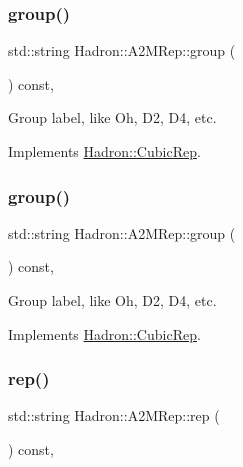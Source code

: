 \subsubsection{\texorpdfstring{group()}{group()}\hspace{0.1cm}{\footnotesize\ttfamily [2/3]}}
{\footnotesize\ttfamily std\+::string Hadron\+::\+A2\+M\+Rep\+::group (\begin{DoxyParamCaption}{ }\end{DoxyParamCaption}) const\hspace{0.3cm}{\ttfamily [inline]}, {\ttfamily [virtual]}}

Group label, like Oh, D2, D4, etc. 

Implements \mbox{\hyperlink{structHadron_1_1CubicRep_a0748f11ec87f387062c8e8981339a29c}{Hadron\+::\+Cubic\+Rep}}.

\mbox{\label{structHadron_1_1A2MRep_acc01c7c94d15b610d4366faa2bc3afaf}} 
\subsubsection{\texorpdfstring{group()}{group()}\hspace{0.1cm}{\footnotesize\ttfamily [3/3]}}
{\footnotesize\ttfamily std\+::string Hadron\+::\+A2\+M\+Rep\+::group (\begin{DoxyParamCaption}{ }\end{DoxyParamCaption}) const\hspace{0.3cm}{\ttfamily [inline]}, {\ttfamily [virtual]}}

Group label, like Oh, D2, D4, etc. 

Implements \mbox{\hyperlink{structHadron_1_1CubicRep_a0748f11ec87f387062c8e8981339a29c}{Hadron\+::\+Cubic\+Rep}}.

\mbox{\label{structHadron_1_1A2MRep_ad219824d3a5220f47e6f3b38d2a60102}} 
\subsubsection{\texorpdfstring{rep()}{rep()}\hspace{0.1cm}{\footnotesize\ttfamily [1/3]}}
{\footnotesize\ttfamily std\+::string Hadron\+::\+A2\+M\+Rep\+::rep (\begin{DoxyParamCaption}{ }\end{DoxyParamCaption}) const\hspace{0.3cm}{\ttfamily [inline]}, {\ttfamily [virtual]}}

